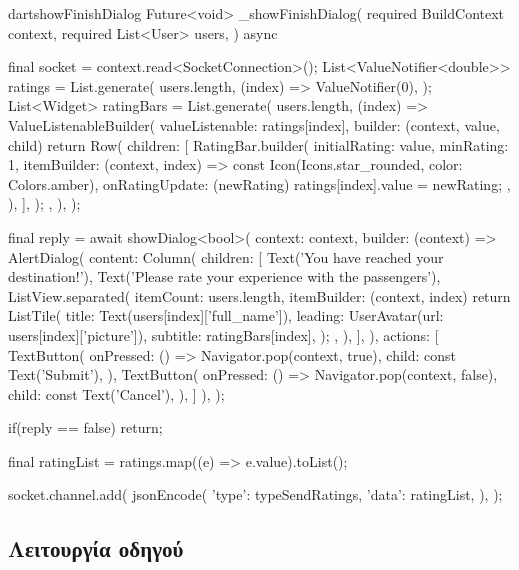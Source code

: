\documentclass[../thesis.tex]{subfiles}
\begin{document}
\begin{codeblock}{dart}{showFinishDialog}
  Future<void> _showFinishDialog({
    required BuildContext context,
    required List<User> users,
  }) async {
    final socket = context.read<SocketConnection>();
    List<ValueNotifier<double>> ratings = List.generate(
      users.length,
      (index) => ValueNotifier(0),
    );
    List<Widget> ratingBars = List.generate(
      users.length,
      (index) => ValueListenableBuilder(
        valueListenable: ratings[index],
        builder: (context, value, child) {
          return Row(
            children: [
              RatingBar.builder(
                initialRating: value,
                minRating: 1,
                itemBuilder: (context, index) =>
                    const Icon(Icons.star_rounded, color: Colors.amber),
                onRatingUpdate: (newRating) {
                  ratings[index].value = newRating;
                },
              ),
            ],
          );
        },
      ),
    );

    final reply = await showDialog<bool>(
      context: context,
      builder: (context) => AlertDialog(
        content: Column(
          children: [
            Text('You have reached your destination!'),
            Text('Please rate your experience with the passengers'),
            ListView.separated(
              itemCount: users.length,
              itemBuilder: (context, index) {
                return ListTile(
                  title: Text(users[index]['full_name']),
                  leading: UserAvatar(url: users[index]['picture']),
                  subtitle: ratingBars[index],
                );
              },
            ),
          ],
        ),
        actions: [
          TextButton(
            onPressed: () => Navigator.pop(context, true),
            child: const Text('Submit'),
          ),
          TextButton(
            onPressed: () => Navigator.pop(context, false),
            child: const Text('Cancel'),
          ),
        ]
      ),
    );

    if(reply == false) return;

    final ratingList = ratings.map((e) => e.value).toList();

    socket.channel.add(
      jsonEncode({
        'type': typeSendRatings,
        'data': ratingList,
      }),
    );
  }
\end{codeblock}

\subsection{Λειτουργία οδηγού}
\end{document}
